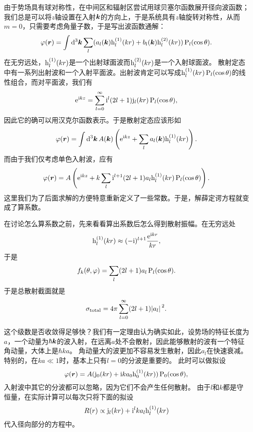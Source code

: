 由于势场具有球对称性，在中间区和辐射区尝试用球贝塞尔函数展开径向波函数；我们总是可以将$z$轴设置在入射$\vb*{k}$的方向上，于是系统具有$z$轴旋转对称性，从而$m=0$，只需要考虑角量子数，于是写出波函数通解：
\[
    \varphi(\vb*{r}) = \int \dd[3]{\vb*{k}} \sum_{l} (a_l(\vb*{k}) \mathrm{h}^{(1)}_l(kr) + b_l(\vb*{k}) \mathrm{h}^{(2)}_l(kr)) \operatorname{P}_l(\cos \theta).
\]
在无穷远处，$\mathrm{h}^{(1)}_l(kr)$是一个出射球面波而$\mathrm{h}^{(2)}_l(kr)$是一个入射球面波。
散射定态中有一系列出射波和一个入射平面波。出射波肯定可以写成$\mathrm{h}^{(1)}_l(kr) \operatorname{P}_l (\cos \theta)$的线性组合，而对平面波，我们有
\begin{equation}
    \mathrm{e}^{\mathrm{i} k z} = \sum_{l=0}^\infty \mathrm{i}^l (2l+1) \mathrm{j}_l (kr) \operatorname{P}_l(\cos \theta),
\end{equation}
因此它的确可以用汉克尔函数表示。于是散射定态应该形如
\[
    \varphi(\vb*{r}) = \int \dd[3]{\vb*{k}} A(\vb*{k}) \left( \mathrm{e}^{\mathrm{i} k z} + \sum_l a_l(\vb*{k}) \mathrm{h}^{(1)}_l(kr)  \right).
\]
而由于我们仅考虑单色入射波，应有
\begin{equation}
    \varphi(\vb*{r}) = A\left( \mathrm{e}^{\mathrm{i} k z} + k \sum_l \mathrm{i}^{l+1} (2l+1) a_l \mathrm{h}^{(1)}_l(kr) \operatorname{P}_l(\cos \theta) \right).
\end{equation}
这里我们为了后面求解的方便特意重新定义了一些常数。于是，解薛定谔方程就变成了算系数。

在讨论怎么算系数之前，先来看看算出系数后怎么得到散射振幅。在无穷远处
\[
    \mathrm{h}^{(1)}_l(kr) \approx (-\mathrm{i})^{l+1} \frac{\mathrm{e}^{\mathrm{i} k r}}{kr},
\]
于是
\begin{equation}
    f_k(\theta, \varphi) = \sum_l (2l+1) a_l \operatorname{P}_l(\cos \theta).
    \label{eq:scattering-amp-waves}
\end{equation}
于是总散射截面就是
\begin{equation}
    \sigma_\text{total} = 4\pi \sum_{l=0}^\infty (2l+1) \abs*{a_l}^2. 
\end{equation}

这个级数是否收敛得足够快？我们有一定理由认为确实如此，设势场的特征长度为$a$，一个动量为$\hbar \vb*{k}$的波入射，在远离$a$处不会散射，因此能够散射的波有一个特征角动量，大体上是$\hbar k a$。
角动量大的波更加不容易发生散射，因此$a_l$在快速衰减。特别的，在$k a \ll 1$时，基本上只有$l=0$的分波是重要的。
此时可以做拟设
\begin{equation}
    \varphi(\vb*{r}) = A (\mathrm{j}_0(kr) + \mathrm{i} k a_0 \mathrm{h}^{(1)}_0(kr)) \operatorname{P}_0(\cos \theta),
\end{equation}
入射波中其它的分波都可以忽略，因为它们不会产生任何散射。
由于$l$和$k$都是守恒量，在实际计算可以每次只将下面的拟设
\begin{equation}
    R(r) \propto \mathrm{j}_l (kr) + \mathrm{i}^{l} k a_l \mathrm{h}^{(1)}_l(kr)
\end{equation}
代入径向部分的方程中。

